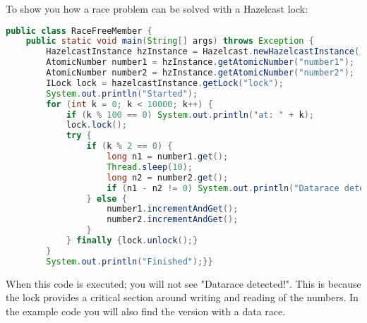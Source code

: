 To show you how a race problem can be solved with a Hazelcast lock:
\begin{lstlisting}[language=java]
public class RaceFreeMember {
    public static void main(String[] args) throws Exception {
        HazelcastInstance hzInstance = Hazelcast.newHazelcastInstance();
        AtomicNumber number1 = hzInstance.getAtomicNumber("number1");
        AtomicNumber number2 = hzInstance.getAtomicNumber("number2");
        ILock lock = hazelcastInstance.getLock("lock");
        System.out.println("Started");
        for (int k = 0; k < 10000; k++) {
            if (k % 100 == 0) System.out.println("at: " + k);
            lock.lock();
            try {
                if (k % 2 == 0) {
                    long n1 = number1.get();
                    Thread.sleep(10);
                    long n2 = number2.get();
                    if (n1 - n2 != 0) System.out.println("Datarace detected!");
                } else {
                    number1.incrementAndGet();
                    number2.incrementAndGet();
                }
            } finally {lock.unlock();}
        }
        System.out.println("Finished");}}
\end{lstlisting}
When this code is executed; you will not see "Datarace detected!". This is because the lock provides a critical section around writing and reading of the numbers. In the example code you will also find the version with a data race.

